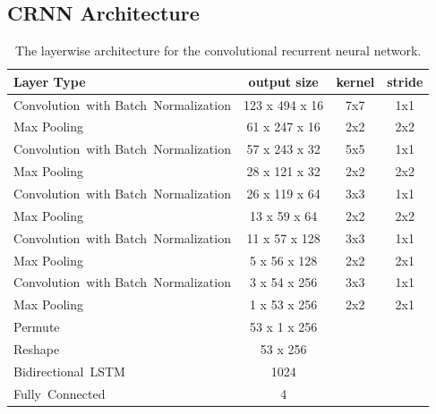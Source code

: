 \subsection{CRNN Architecture}

    
  \begin{table}[h]
  \centering
  \begin{tabularx}{\textwidth}{Xccc}
  \toprule
Layer Type                                          & output size    & kernel & stride  \\ \midrule
\mbox{Convolution with} \mbox{Batch Normalization}  & 123 x 494 x 16  & 7x7    & 1x1     \\ 
Max Pooling                                         & 61 x 247 x 16   & 2x2    & 2x2     \\ 
\mbox{Convolution with} \mbox{Batch Normalization}  & 57 x 243 x 32   & 5x5    & 1x1     \\ 
Max Pooling                                         & 28 x 121 x 32   & 2x2    & 2x2     \\ 
\mbox{Convolution with} \mbox{Batch Normalization}  & 26 x 119 x 64   & 3x3    & 1x1     \\ 
Max Pooling                                         & 13 x 59 x 64    & 2x2    & 2x2     \\ 
\mbox{Convolution with} \mbox{Batch Normalization}  & 11 x 57 x 128   & 3x3    & 1x1     \\ 
Max Pooling                                         & 5 x 56 x 128    & 2x2    & 2x1     \\ 
\mbox{Convolution with} \mbox{Batch Normalization}  & 3 x 54 x 256    & 3x3    & 1x1     \\ 
Max Pooling                                         & 1 x 53 x 256    & 2x2    & 2x1     \\ 
Permute                                             & 53 x 1 x 256    &        &         \\
Reshape                                             & 53 x 256        &        &         \\
\mbox{Bidirectional LSTM}                           & 1024            &        &         \\
\mbox{Fully Connected}                              & 4               &        &         \\
  \bottomrule
  \end{tabularx}
  \caption{The layerwise architecture for the convolutional recurrent neural network.}
  \label{tab:layers_CRNN}
  \end{table}
  
  
